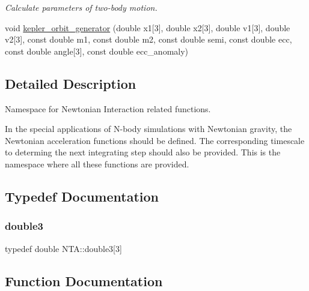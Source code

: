 \begin{DoxyCompactItemize}
\begin{DoxyCompactList}\small\item\em Calculate parameters of two-\/body motion. \end{DoxyCompactList}\item 
void \hyperlink{namespaceNTA_a621b3643cd91a5a7ea23b7b22481f121}{kepler\+\_\+orbit\+\_\+generator} (double x1\mbox{[}3\mbox{]}, double x2\mbox{[}3\mbox{]}, double v1\mbox{[}3\mbox{]}, double v2\mbox{[}3\mbox{]}, const double m1, const double m2, const double semi, const double ecc, const double angle\mbox{[}3\mbox{]}, const double ecc\+\_\+anomaly)
\end{DoxyCompactItemize}


\subsection{Detailed Description}
Namespace for Newtonian Interaction related functions. 

In the special applications of N-\/body simulations with Newtonian gravity, the Newtonian acceleration functions should be defined. The corresponding timescale to determing the next integrating step should also be provided. This is the namespace where all these functions are provided. 

\subsection{Typedef Documentation}
\hypertarget{namespaceNTA_a19ccaac066849b26305dbbbee129fa0e}{}\label{namespaceNTA_a19ccaac066849b26305dbbbee129fa0e} 
\subsubsection{\texorpdfstring{double3}{double3}}
{\footnotesize\ttfamily typedef double N\+T\+A\+::double3\mbox{[}3\mbox{]}}



\subsection{Function Documentation}
\hypertarget{namespaceNTA_a02d22f02e21004b264c8257a5ffbb600}{}\label{namespaceNTA_a02d22f02e21004b264c8257a5ffbb600} 
